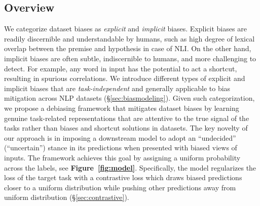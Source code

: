 \subsection{Overview}
We categorize dataset biases as \textit{explicit} and \textit{implicit} biases. Explicit biases are readily discernible and understandable by humans, such as high degree of lexical overlap between the premise and hypothesis in case of NLI. On the other hand, implicit biases are often subtle, indiscernible to humans, and more challenging  
to detect. For example, any word in input has the potential to act a shortcut, resulting in spurious correlations. 
We introduce different types of explicit and implicit biases that are {\em task-independent} and generally applicable to bias mitigation across NLP datasets (\S\ref{sec:biasmodeling}). 
%
Given such categorization, we propose a debiasing framework that mitigates dataset biases by learning genuine task-related representations that are attentive to the true signal of the tasks rather than biases and shortcut solutions in datasets. 
The key novelty of our approach is in imposing a downstream model to adopt an ``undecided'' (``uncertain'') stance in its predictions when presented with biased views of inputs. The framework achieves this goal by assigning a uniform probability across the labels, see \textbf{Figure~\ref{fig:model}}. 
Specifically, the model regularizes the loss of the target task with a contrastive loss which draws biased predictions closer to a uniform distribution while pushing other predictions away from uniform distribution (\S\ref{sec:contrastive}).  
%









